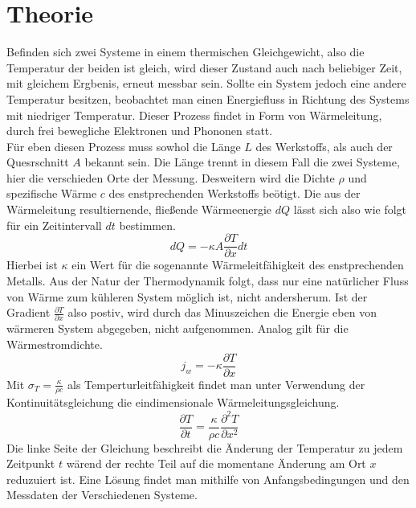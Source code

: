 \section{Theorie}
Befinden sich zwei Systeme in einem thermischen Gleichgewicht, also die Temperatur der beiden ist gleich, 
wird dieser Zustand auch nach beliebiger Zeit, mit gleichem Ergbenis, erneut messbar sein. Sollte ein System jedoch eine andere Temperatur besitzen, beobachtet 
man einen Energiefluss in Richtung des Systems mit niedriger Temperatur. Dieser Prozess findet in Form von Wärmeleitung, durch frei bewegliche Elektronen und Phononen statt.
\\
\newline
Für eben diesen Prozess muss sowhol die Länge $L$ des Werkstoffs, als auch der Quesrschnitt $A$ bekannt sein. Die Länge trennt in diesem Fall die zwei Systeme,
hier die verschieden Orte der Messung. Desweitern wird die Dichte $\rho$ und spezifische Wärme $c$ des enstprechenden Werkstoffs beötigt.
Die aus der Wärmeleitung resultiernende, fließende Wärmeenergie $dQ$ lässt sich also wie folgt für ein Zeitintervall $dt$ bestimmen.
\begin{equation}
    \label{eqn:itsHeadacheTimeYeeeay}
    dQ = -\kappa A \frac{\partial T}{\partial x} dt 
\end{equation}
Hierbei ist $\kappa$ ein Wert für die sogenannte Wärmeleitfähigkeit des enstprechenden Metalls. Aus der Natur der Thermodynamik 
folgt, dass nur eine natürlicher Fluss von Wärme zum kühleren System möglich ist, nicht andersherum. Ist der Gradient $\frac{\partial T}{\partial x}$ also postiv, 
wird durch das Minuszeichen die Energie eben von wärmeren System abgegeben, nicht aufgenommen.
Analog gilt für die Wärmestromdichte.
\begin{equation}
    \label{eqn:stromdichte}
    j_w = -\kappa \frac{\partial T}{\partial x}
\end{equation}
Mit $ \sigma_T = \frac{\kappa}{\rho c}$ als Temperturleitfähigkeit findet man unter Verwendung der Kontinuitätsgleichung die eindimensionale Wärmeleitungsgleichung.
\begin{equation}
    \label{eqn:1dim}
    \frac{\partial T}{\partial t} = \frac{\kappa}{\rho c} \frac{\partial^2 T}{\partial x^2}
\end{equation}
Die linke Seite der Gleichung beschreibt die Änderung der Temperatur zu jedem Zeitpunkt $t$ wärend der rechte Teil 
auf die momentane Änderung am Ort $x$ reduzuiert ist. Eine Lösung findet man mithilfe von Anfangsbedingungen und den Messdaten 
der Verschiedenen Systeme.
